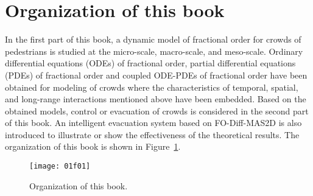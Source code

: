 \documentclass[]{chencao}
\begin{document}
\section{Organization of this book}

In the first part of this book, a dynamic model of fractional order for
crowds of pedestrians is studied at the micro-scale, macro-scale, and
meso-scale. Ordinary differential equations (ODEs) of fractional order,
partial differential equations (PDEs) of fractional order and coupled
ODE-PDEs of fractional order have been obtained for modeling of crowds
where the characteristics of temporal, spatial, and long-range
interactions mentioned above have been embedded. Based on the obtained
models, control or evacuation of crowds is considered in the second part
of this book. An intelligent evacuation system based on FO-Diff-MAS2D
is also introduced to illustrate or show the effectiveness of the
theoretical results. The organization of this book is shown in Figure~\ref{1.Fig:organization}.

\begin{figure}
\begin{centering}
\texttt{[image: 01f01]}
\end{centering}
\caption{Organization of this book.}
\label{1.Fig:organization}
\end{figure}
\end{document}
